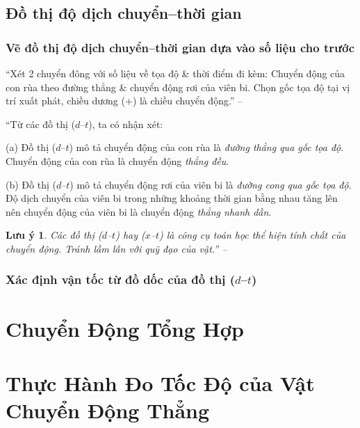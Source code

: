 \documentclass[oneside]{book}
\numberwithin{equation}{section}
\newtheorem{luuy}{Lưu ý}[section]
\begin{document}
\subsection{Đồ thị độ dịch chuyển--thời gian}

\subsubsection{Vẽ đồ thị độ dịch chuyển--thời gian dựa vào số liệu cho trước}
``Xét 2 chuyển đông với số liệu về tọa độ \& thời điểm đi kèm: Chuyển động của con rùa theo đường thẳng \& chuyển động rơi của viên bi. Chọn gốc tọa độ tại vị trí xuất phát, chiều dương ($+$) là chiều chuyển động.'' -- \cite[p. 28]{SGK_Vat_Ly_10_Chan_Troi_Sang_Tao}

``Từ các đồ thị ($d$--$t$), ta có nhận xét:
\begin{enumerate*}
	\item[(a)] Đồ thị ($d$--$t$) mô tả chuyển động của con rùa là \textit{đường thẳng qua gốc tọa độ}. Chuyển động của con rùa là chuyển động \textit{thẳng đều}.
	\item[(b)] Đồ thị ($d$--$t$) mô tả chuyển động rơi của viên bi là \textit{đường cong qua gốc tọa độ}. Độ dịch chuyển của viên bi trong những khoảng thời gian bằng nhau tăng lên nên chuyển động của viên bi là chuyển động \textit{thẳng nhanh dần}.
\end{enumerate*}

\begin{luuy}
	Các đồ thị ($d$--$t$) hay ($x$--$t$) là công cụ toán học thể hiện tính chất của chuyển động. Tránh lầm lẫn với quỹ đạo của vật.'' -- \cite[p. 29]{SGK_Vat_Ly_10_Chan_Troi_Sang_Tao}
\end{luuy}

\subsubsection{Xác định vận tốc từ đồ dốc của đồ thị ($d$--$t$)}


\section{Chuyển Động Tổng Hợp}


\section{Thực Hành Đo Tốc Độ của Vật Chuyển Động Thẳng}
\end{document}
